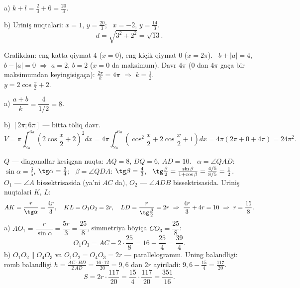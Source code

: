 a) $k+l=\frac23+6=\frac{20}3$.

b) Uriniş nuqtalari: $x=1$, $y=\frac{20}3$; \ $x=-2$, $y=\frac{14}3$.
\[d=\sqrt{3^2+2^2}=\sqrt{13}.\]

\newpage
{}
Grafikdan: eng katta qiymat $4$ ($x=0$), eng kiçik qiymat $0$ ($x=2\pi$). \ $b+|a|=4$, $b-|a|=0$ $\Rightarrow$ $a=2$, $b=2$ ($x=0$ da maksimum). Davr $4\pi$ ($0$ dan $4\pi$ gaça bir maksimumdan keyingisigaça): $\frac{2\pi}k=4\pi$ $\Rightarrow$ $k=\frac12$.\\
$y=2\cos\frac x2+2$.

a) $\dfrac{a+b}k=\dfrac4{1/2}=8$.

b) $[2\pi;6\pi]$ — bitta töliq davr.
\[V=\pi\int_{2\pi}^{6\pi}\left(2\cos\frac x2+2\right)^2dx=4\pi\int_{2\pi}^{6\pi}\left(\cos^2\frac x2+2\cos\frac x2+1\right)dx=4\pi\left(2\pi+0+4\pi\right)=24\pi^2.\]

\newpage
{}
$Q$ — diagonallar kesişgan nuqta: $AQ=8$, $DQ=6$, $AD=10$. \ $\alpha=\angle QAD$: $\sin\alpha=\frac35$, $\tg\alpha=\frac34$; \ $\beta=\angle QDA$: $\tg\beta=\frac43$, \ $\tg\frac\beta2=\frac{\sin\beta}{1+\cos\beta}=\frac{4/5}{8/5}=\frac12$.\\
$O_1$ — $\angle A$ bissektrisasida (ya'ni $AC$ da), $O_2$ — $\angle ADB$ bissektrisasida. Uriniş nuqtalari $K$, $L$:
\[AK=\frac r{\tg\alpha}=\frac{4r}3,\quad KL=O_1O_2=2r,\quad LD=\frac r{\tg\frac\beta2}=2r\ \Rightarrow\ \frac{4r}3+4r=10\ \Rightarrow\ r=\frac{15}8.\]
a) $AO_1=\dfrac r{\sin\alpha}=\dfrac{5r}3=\dfrac{25}8$, simmetriya böyiça $CO_3=\dfrac{25}8$:
\[O_1O_3=AC-2\cdot\frac{25}8=16-\frac{25}4=\frac{39}4.\]
b) $O_1O_2\parallel O_4O_3$ va $O_1O_2=O_4O_3=2r$ — parallelogramm. Uning balandligi: romb balandligi $h=\frac{AC\cdot BD}{2\,AD}=\frac{16\cdot12}{20}=9{,}6$ dan $2r$ ayiriladi: $9{,}6-\frac{15}4=\frac{117}{20}$.
\[S=2r\cdot\frac{117}{20}=\frac{15}4\cdot\frac{117}{20}=\frac{351}{16}.\]

